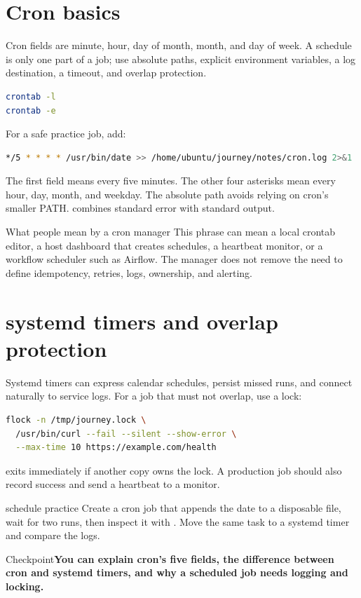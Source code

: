 \documentclass[11pt,a4paper,openany]{book}
\newcommand{\command}[1]{\texttt{\small\detokenize{#1}}}
\newcommand{\checkpoint}[1]{\begin{mentalbox}{Checkpoint}\textbf{#1}\end{mentalbox}}
\begin{document}
\section{Cron basics}
Cron fields are minute, hour, day of month, month, and day of week. A schedule is only one part of a job; use absolute paths, explicit environment variables, a log destination, a timeout, and overlap protection.
\begin{lstlisting}[language=bash]
crontab -l
crontab -e
\end{lstlisting}
For a safe practice job, add:
\begin{lstlisting}[language=bash]
*/5 * * * * /usr/bin/date >> /home/ubuntu/journey/notes/cron.log 2>&1
\end{lstlisting}
The first field means every five minutes. The other four asterisks mean every hour, day, month, and weekday. The absolute path avoids relying on cron's smaller PATH. \command{2\&1} combines standard error with standard output.
\begin{mentalbox}{What people mean by a cron manager}
This phrase can mean a local crontab editor, a host dashboard that creates schedules, a heartbeat monitor, or a workflow scheduler such as Airflow. The manager does not remove the need to define idempotency, retries, logs, ownership, and alerting.
\end{mentalbox}
\section{systemd timers and overlap protection}
Systemd timers can express calendar schedules, persist missed runs, and connect naturally to service logs. For a job that must not overlap, use a lock:
\begin{lstlisting}[language=bash]
flock -n /tmp/journey.lock \
  /usr/bin/curl --fail --silent --show-error \
  --max-time 10 https://example.com/health
\end{lstlisting}
\command{flock -n} exits immediately if another copy owns the lock. A production job should also record success and send a heartbeat to a monitor.
\begin{trybox}{schedule practice}
Create a cron job that appends the date to a disposable file, wait for two runs, then inspect it with \command{tail}. Move the same task to a systemd timer and compare the logs.
\end{trybox}
\checkpoint{You can explain cron's five fields, the difference between cron and systemd timers, and why a scheduled job needs logging and locking.}
\end{document}
